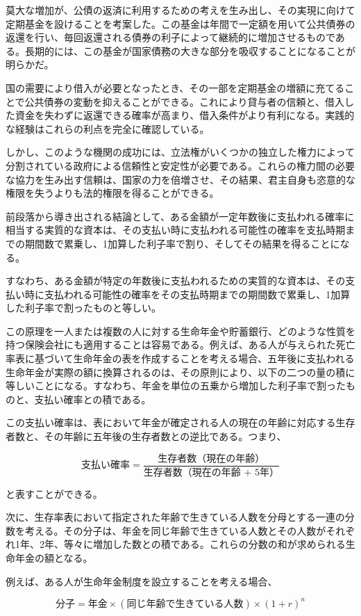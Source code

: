 \documentclass[a4paper,11pt,openany]{ltjsbook}
\begin{document}
莫大な増加が、公債の返済に利用するための考えを生み出し、その実現に向けて定期基金を設けることを考案した。この基金は年間で一定額を用いて公共債券の返還を行い、毎回返還される債券の利子によって継続的に増加させるものである。長期的には、この基金が国家債務の大きな部分を吸収することになることが明らかだ。

国の需要により借入が必要となったとき、その一部を定期基金の増額に充てることで公共債券の変動を抑えることができる。これにより貸与者の信頼と、借入した資金を失わずに返還できる確率が高まり、借入条件がより有利になる。実践的な経験はこれらの利点を完全に確認している。

しかし、このような機関の成功には、立法権がいくつかの独立した権力によって分割されている政府による信頼性と安定性が必要である。これらの権力間の必要な協力を生み出す信頼は、国家の力を倍増させ、その結果、君主自身も恣意的な権限を失うよりも法的権限を得ることができる。

前段落から導き出される結論として、ある金額が一定年数後に支払われる確率に相当する実質的な資本は、その支払い時に支払われる可能性の確率を支払時期までの期間数で累乗し、1加算した利子率で割り、そしてその結果を得ることになる。

すなわち、ある金額が特定の年数後に支払われるための実質的な資本は、その支払い時に支払われる可能性の確率をその支払時期までの期間数で累乗し、1加算した利子率で割ったものと等しい。

この原理を一人または複数の人に対する生命年金や貯蓄銀行、どのような性質を持つ保険会社にも適用することは容易である。例えば、ある人が与えられた死亡率表に基づいて生命年金の表を作成することを考える場合、五年後に支払われる生命年金が実際の額に換算されるのは、その原則により、以下の二つの量の積に等しいことになる。すなわち、年金を単位の五乗から増加した利子率で割ったものと、支払い確率との積である。

この支払い確率は、表において年金が確定される人の現在の年齢に対応する生存者数と、その年齢に五年後の生存者数との逆比である。つまり、

$$
\text{支払い確率} = \frac{\text{生存者数（現在の年齢）}}{\text{生存者数（現在の年齢 + 5年）}}
$$

と表すことができる。

次に、生存率表において指定された年齢で生きている人数を分母とする一連の分数を考える。その分子は、年金を同じ年齢で生きている人数とその人数がそれぞれ1年、2年、等々に増加した数との積である。これらの分数の和が求められる生命年金の額となる。

例えば、ある人が生命年金制度を設立することを考える場合、

$$
\text{分子} = \text{年金} \times (\text{同じ年齢で生きている人数}) \times (1 + r)^n
$$
\end{document}
